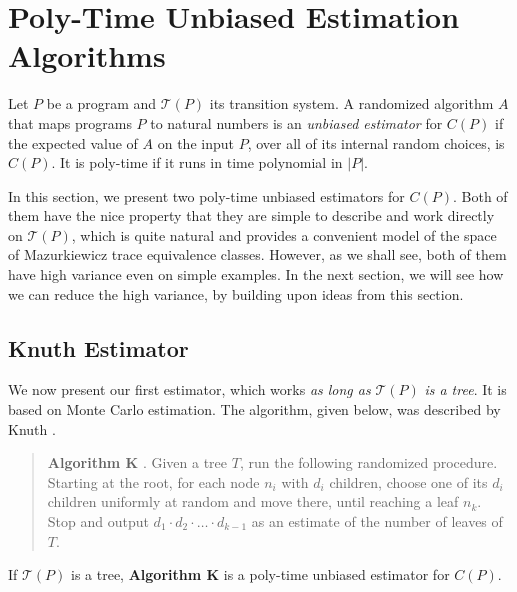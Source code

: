 \documentclass[acmsmall]{acmart}
\begin{document}



\section{Poly-Time Unbiased Estimation Algorithms} 
\label{sec:pestor}
Let $P$ be a program and $\mathcal{T}(P)$ its transition system.
A randomized algorithm $A$ that maps programs $P$ to natural numbers 
is an \emph{unbiased estimator} for $C(P)$ if
the expected value of $A$ on the input $P$, over all of its internal random choices, is $C(P)$.
It is poly-time if it runs in time polynomial in $|P|$.

In this section, we present two poly-time unbiased estimators for $C(P)$.
Both of them have the nice property that they are simple to describe and work directly on $\mathcal{T}(P)$, which is quite natural and provides a convenient model of the space of Mazurkiewicz trace equivalence classes. However, as we shall see, both of them have high variance even on simple examples. 
In the next section, we will see how we can reduce the high variance, by building upon ideas from this section.



\subsection{Knuth Estimator}
We now present our first estimator, which works \textit{as long as} $\mathcal{T}(P)$ \textit{is a tree}. It is based on Monte Carlo estimation.
The algorithm, given below, was described by Knuth \cite{knuth75}.

\begin{verse}
\label{algo:K}
\textbf{Algorithm K} \cite{knuth75}. 
Given a tree $T$, run the following randomized procedure.
Starting at the root,
for each node $n_i$ with $d_i$ children, choose one of its $d_i$ children uniformly at random and move there, until reaching a leaf $n_k$.
Stop and output $d_1 \cdot d_2 \cdot \ldots \cdot d_{k-1}$ as an estimate of the number of leaves of $T$.
\end{verse}

\begin{proposition}{\cite{knuth75}}
If $\mathcal{T}(P)$ is a tree, \textbf{Algorithm K} is a poly-time unbiased estimator for $C(P)$.
\end{proposition}
\end{document}
